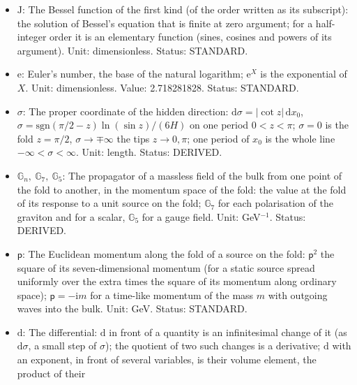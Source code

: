 \documentclass[
  10pt,
]{article}
\begin{document}
\begin{itemize}
  constant \(\Lambda = -21H^2\) and the tension
  \(\kappa\lambda_{\mathrm{F}} = 12H\) of the fold; in UM-4 a free
  parameter, bounded from below by the propagation of the gauge fields
  in the bulk. Unit: GeV (1/length). Value: \(H > 2534\) GeV, about 2.5
  TeV (from the invisible width of the Z boson). Status: AUTHOR.
\item
  \(\mathrm{J}\): The Bessel function of the first kind (of the order
  written as its subscript): the solution of Bessel's equation that is
  finite at zero argument; for a half-integer order it is an elementary
  function (sines, cosines and powers of its argument). Unit:
  dimensionless. Status: STANDARD.
\item
  \(\mathrm{e}\): Euler's number, the base of the natural logarithm;
  \(\mathrm{e}^{X}\) is the exponential of \(X\). Unit: dimensionless.
  Value: 2.718281828. Status: STANDARD.
\item
  \(\sigma\): The proper coordinate of the hidden direction:
  \(\mathrm{d}\sigma = \lvert\cot z\rvert\,\mathrm{d}x_0\),
  \(\sigma = \mathrm{sgn}(\pi/2 - z)\ln(\sin z)/(6H)\) on one period
  \(0 < z < \pi\); \(\sigma = 0\) is the fold \(z = \pi/2\),
  \(\sigma \to \mp\infty\) the tips \(z \to 0, \pi\); one period of
  \(x_0\) is the whole line \(-\infty < \sigma < \infty\). Unit: length.
  Status: DERIVED.
\item
  \(\mathbb{G}_n,\ \mathbb{G}_7,\ \mathbb{G}_5\): The propagator of a
  massless field of the bulk from one point of the fold to another, in
  the momentum space of the fold: the value at the fold of its response
  to a unit source on the fold; \(\mathbb{G}_7\) for each polarisation
  of the graviton and for a scalar, \(\mathbb{G}_5\) for a gauge field.
  Unit: GeV\(^{-1}\). Status: DERIVED.
\item
  \(\mathsf{p}\): The Euclidean momentum along the fold of a source on
  the fold: \(\mathsf{p}^2\) the square of its seven-dimensional
  momentum (for a static source spread uniformly over the extra times
  the square of its momentum along ordinary space);
  \(\mathsf{p} = -\mathrm{i}m\) for a time-like momentum of the mass
  \(m\) with outgoing waves into the bulk. Unit: GeV. Status: STANDARD.
\item
  \(\mathrm{d}\): The differential: \(\mathrm{d}\) in front of a
  quantity is an infinitesimal change of it (as \(\mathrm{d}\sigma\), a
  small step of \(\sigma\)); the quotient of two such changes is a
  derivative; \(\mathrm{d}\) with an exponent, in front of several
  variables, is their volume element, the product of their

\end{itemize}
\end{document}
